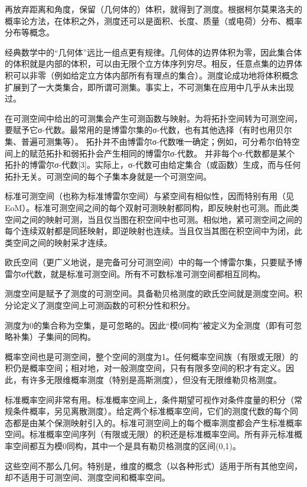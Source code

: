 \documentclass[UTF8]{../../09-Mathematics}
\begin{document}
再放弃距离和角度，保留（几何体的）体积，就得到了测度。根据柯尔莫果洛夫的概率论方法，在体积之外，测度还可以是面积、长度、质量（或电荷）分布、概率分布等概念。

经典数学中的“几何体”远比一组点更有规律。几何体的边界体积为零，因此集合体的体积就是内部的体积，可以由无限个立方体序列穷尽。相反，任意点集的边界体积可以非零（例如给定立方体内部所有有理点的集合）。测度论成功地将体积概念扩展到了一大类集合，即所谓可测集。事实上，不可测集在应用中几乎从未出现过。

在可测空间中给出的可测集会产生可测函数与映射。为将拓扑空间转为可测空间，要赋予它σ-代数。最常用的是博雷尔集的σ-代数，也有其他选择（有时也用贝尔集、普遍可测集等）。 拓扑并不由博雷尔σ-代数唯一确定；例如，可分希尔伯特空间上的赋范拓扑和弱拓扑会产生相同的博雷尔σ-代数。 并非每个σ-代数都是某个拓扑的博雷尔σ-代数[3]。实际上，σ-代数可由给定集合（或函数）生成，而与任何拓扑无关。可测空间的每个子集本身就是一个可测空间。

标准可测空间（也称为标准博雷尔空间）与紧空间有相似性，因而特别有用（见EoM）。标准可测空间之间的每个双射可测映射都同构，即反映射也可测。而此类空间之间的映射可测，当且仅当图在积空间中也可测。相似地，紧可测空间之间的每个连续双射都是同胚映射，即逆映射也连续。当且仅当其图在积空间中为闭，此类空间之间的映射采才连续。

欧氏空间（更广义地说，是完备可分可测空间）中的每一个博雷尔集，只要赋予博雷尔σ代数，就是标准可测空间。所有不可数标准可测空间都相互同构。

测度空间是赋予了测度的可测空间。具备勒贝格测度的欧氏空间就是测度空间。积分论定义了测度空间上可测函数的可积分性和积分。

测度为0的集合称为空集，是可忽略的。因此“模0同构”被定义为全测度（即有可忽略补集）子集间的同构。

概率空间也是可测空间，整个空间的测度为1。任何概率空间族（有限或无限）的积仍是概率空间；相对地，对一般测度空间，只有有限多空间的积才有定义。因此，有许多无限维概率测度（特别是高斯测度），但没有无限维勒贝格测度。

标准概率空间非常有用。标准概率空间上，条件期望可视作对条件度量的积分（常规条件概率，另见离散测度）。给定两个标准概率空间，它们的测度代数的每个同态都是由某个保测映射引入的。标准可测空间上的每个概率测度都会产生标准概率空间。标准概率空间序列（有限或无限）的积还是标准概率空间。所有非元标准概率空间都互为模0同构，其中一个是具有勒贝格测度的区间(0,1)。

这些空间不那么几何。特别是，维度的概念（以各种形式）适用于所有其他空间，却不适用于可测空间、测度空间和概率空间。
\end{document}
